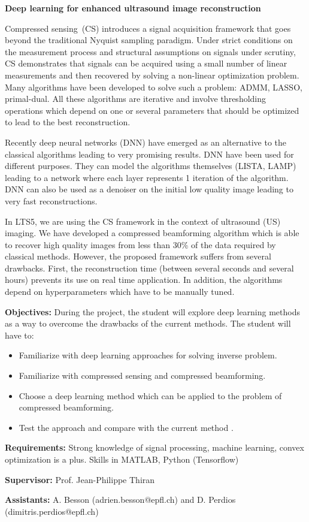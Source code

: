 \documentclass{article}
\newcommand\skipline{\vspace{\baselineskip}}
\begin{document}
\textbf{Deep learning for enhanced ultrasound image reconstruction}

\skipline
\par Compressed sensing~(CS) introduces a signal acquisition framework that goes beyond the traditional Nyquist sampling paradigm. Under strict conditions on the measurement process and structural assumptions on signals under scrutiny, CS demonstrates that signals can be acquired using a small number of linear measurements and then recovered by solving a non-linear optimization problem. Many algorithms have been developed to solve such a problem: ADMM, LASSO, primal-dual. All these algorithms are iterative and involve thresholding operations which depend on one or several parameters that should be optimized to lead to the best reconstruction.
\par Recently deep neural networks (DNN) have emerged as an alternative to the classical algorithms leading to very promising results. DNN have been used for different purposes. They can model the algorithms themselves (LISTA, LAMP) leading to a network where each layer represents 1 iteration of the algorithm. DNN can also be used as a denoiser on the initial low quality image leading to very fast reconstructions.
\par In LTS5, we are using the CS framework in the context of ultrasound (US) imaging. We have developed a compressed beamforming algorithm which is able to recover high quality images from less than 30\% of the data required by classical methods. However, the proposed framework suffers from several drawbacks. First, the reconstruction time (between several seconds and several hours) prevents its use on real time application. In addition, the algorithms depend on hyperparameters which have to be manually tuned. 

\skipline
\textbf{Objectives:} During the project, the student will explore deep learning methods as a way to overcome the drawbacks of the current methods. The student will have to:
\begin{itemize}
	\item Familiarize with deep learning approaches for solving inverse problem.
	\item Familiarize with compressed sensing and compressed beamforming.
	\item Choose a deep learning method which can be applied to the problem of compressed beamforming.
	\item Test the approach and compare with the current method .
\end{itemize}

\textbf{Requirements:} Strong knowledge of signal processing, machine learning, convex optimization is a plus. Skills in MATLAB, Python (Tensorflow) 

\textbf{Supervisor:} Prof. Jean-Philippe Thiran

\textbf{Assistants:} A. Besson (adrien.besson@epfl.ch) and D. Perdios (dimitris.perdios@epfl.ch)
\end{document}
